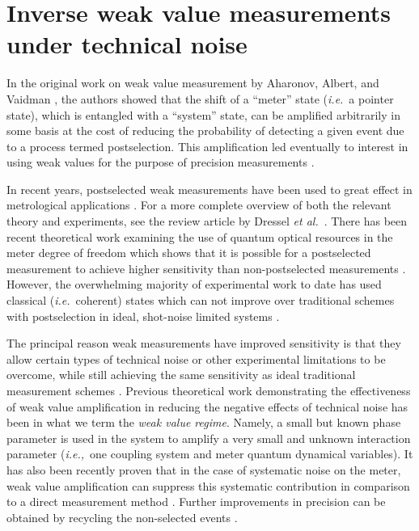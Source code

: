 \chapter[Weak values under noise]{Inverse weak value measurements under technical noise}\label{ch:iwv}
In the original work on weak value measurement by Aharonov, Albert, and Vaidman \cite{Aharonov1988}, the authors showed that the shift of a ``meter'' state (\emph{i.e.}~a pointer state), which is entangled with a ``system'' state, can be amplified arbitrarily in some basis at the cost of reducing the probability of detecting a given event due to a process termed postselection.  This amplification led eventually to interest in using weak values for the purpose of precision measurements \cite{Hosten2008,Dixon2009}. 
 
In recent years, postselected weak measurements have been used to great effect in metrological applications \cite{Dixon2009,Starling2009,Starling2010,Starling2010a,Howell2010,Hogan2011,Pfeifer2011,Egan2012,Gorodetski2012,Zhou2012,Strubi2013,Viza2013,Xu2013,Zhou2013,Loaiza2014,Salazar2014,Salazar2015}.  For a more complete overview of both the relevant theory and experiments, see the review article by Dressel \emph{et al.}~\cite{Dressel2014}.  There has been recent theoretical work 
examining the use of quantum optical resources in the meter degree of freedom which shows that it is possible for a postselected measurement to achieve higher sensitivity than non-postselected measurements \cite{Pang2014,Pang2015}.  However, the overwhelming majority of experimental work to date has used classical (\emph{i.e.}~coherent) states which can not improve over traditional schemes with postselection in ideal, shot-noise limited systems \cite{Pang2015}.

The principal reason weak measurements have improved sensitivity is that they allow certain types of technical  noise or other experimental limitations to be overcome, while still achieving the same sensitivity as ideal traditional measurement schemes \cite{Starling2009,Jordan2014,Knee2014,Viza2015,Alves2015,Torres2016,Harris2016}.  Previous theoretical work demonstrating the effectiveness of weak value amplification in reducing the negative effects of technical noise has been in what we term the \emph{weak value regime}.  Namely, a small but known phase parameter is used in the system to amplify a very small and unknown interaction parameter (\emph{i.e.,}~one coupling system and meter quantum dynamical variables).  It has also been recently proven that in the case of systematic noise on the meter, weak value amplification can suppress this systematic contribution in comparison to a direct measurement method \cite{Pang2016}.  Further improvements in precision can be obtained by recycling the non-selected events \cite{Dressel2013,Lyons2015,Byard2015,Wang2016}.

